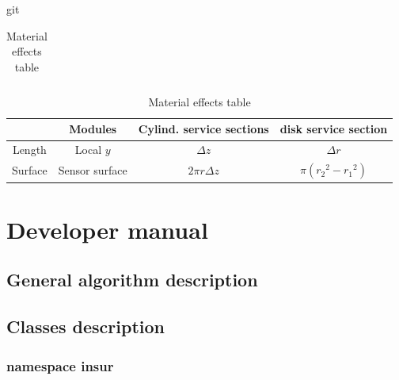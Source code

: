 git\documentclass[12pt, a4paper]{article}
\begin{document}
\begin{landscape}
\begin{table}[hbtp]
\begin{minipage}{\textwidth}
\begin{savenotes}
\begin{center}
\begin{tabular}{|c||c|c|c|}
            \hline
          \end{tabular}
        \end{center}
        \begin{center}
          \tiny
          \begin{tabular}{|c|c|c|c|}
            \hline
            & Modules & Cylind. service sections & disk service section \\
            \hline
            Length & Local $y$ & $\Delta z$ & $\Delta r$ \\
            \hline
            Surface & Sensor surface & $2\pi r \Delta z$ & $\pi({r_2}^2 - {r_1}^2)$ \\
            \hline
          \end{tabular}
        \end{center}
      \end{savenotes}
    \end{minipage}
    \caption{Material effects table}
    \label{tab:materialEffect}
  \end{table}
\end{landscape}



\section{Developer manual}\label{sec:developerManual}

\subsection{General algorithm description}






\subsection{Classes description}

\subsubsection{namespace insur}
\end{document}
